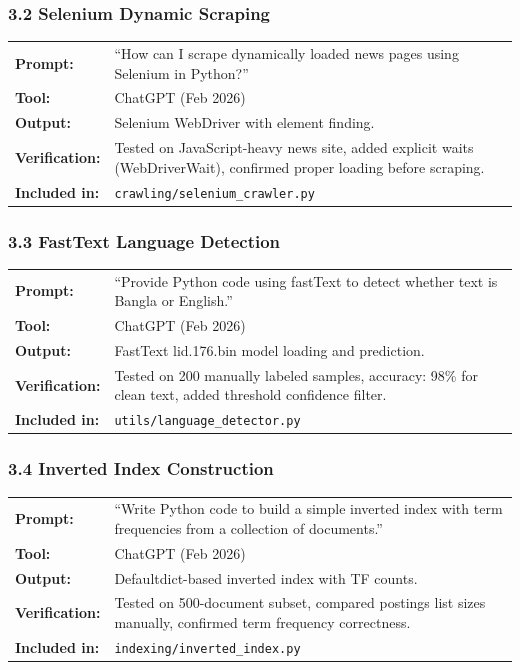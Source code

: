 \documentclass[12pt,a4paper]{article}
\begin{document}
\subsubsection*{3.2 Selenium Dynamic Scraping}
\begin{tabular}{p{3.2cm}p{9.5cm}}
\textbf{Prompt:}        & ``How can I scrape dynamically loaded news pages using Selenium in Python?'' \\
\textbf{Tool:}          & ChatGPT (Feb 2026) \\
\textbf{Output:}        & Selenium WebDriver with element finding. \\
\textbf{Verification:}  & Tested on JavaScript-heavy news site, added explicit waits (WebDriverWait), confirmed proper loading before scraping. \\
\textbf{Included in:}   & \texttt{crawling/selenium\_crawler.py} \\
\end{tabular}

\subsubsection*{3.3 FastText Language Detection}
\begin{tabular}{p{3.2cm}p{9.5cm}}
\textbf{Prompt:}        & ``Provide Python code using fastText to detect whether text is Bangla or English.'' \\
\textbf{Tool:}          & ChatGPT (Feb 2026) \\
\textbf{Output:}        & FastText lid.176.bin model loading and prediction. \\
\textbf{Verification:}  & Tested on 200 manually labeled samples, accuracy: 98\% for clean text, added threshold confidence filter. \\
\textbf{Included in:}   & \texttt{utils/language\_detector.py} \\
\end{tabular}

\subsubsection*{3.4 Inverted Index Construction}
\begin{tabular}{p{3.2cm}p{9.5cm}}
\textbf{Prompt:}        & ``Write Python code to build a simple inverted index with term frequencies from a collection of documents.'' \\
\textbf{Tool:}          & ChatGPT (Feb 2026) \\
\textbf{Output:}        & Defaultdict-based inverted index with TF counts. \\
\textbf{Verification:}  & Tested on 500-document subset, compared postings list sizes manually, confirmed term frequency correctness. \\
\textbf{Included in:}   & \texttt{indexing/inverted\_index.py} \\
\end{tabular}
\end{document}
